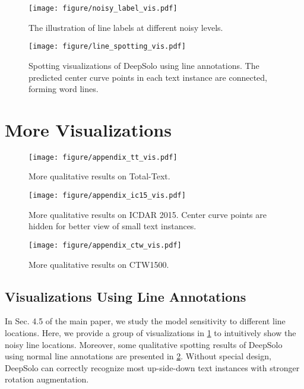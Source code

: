 \documentclass[10pt,twocolumn,letterpaper]{article}
\begin{document}
\begin{figure}[!t]
    \centering
    \texttt{[image: figure/noisy\_label\_vis.pdf]}
    \caption{The illustration of line labels at different noisy levels.}
    \label{fig:noisy_label_vis}
\end{figure}

\begin{figure}[!t]
    \centering
    \texttt{[image: figure/line\_spotting\_vis.pdf]}
    \caption{Spotting visualizations of DeepSolo using line annotations. The predicted center curve points in each text instance are connected, forming word lines.}
    \label{fig:line_spotting_vis}
\end{figure}

\section{More Visualizations}
\label{sec:vis}

\begin{figure*}[!t]
    \centering
    \texttt{[image: figure/appendix\_tt\_vis.pdf]}
    \caption{More qualitative results on Total-Text.}
    \label{fig:tt_vis}
\end{figure*}

\begin{figure*}[!t]
    \centering
    \texttt{[image: figure/appendix\_ic15\_vis.pdf]}
    \caption{More qualitative results on ICDAR 2015. Center curve points are hidden for better view of small text instances.}
    \label{fig:ic15_vis}
\end{figure*}

\begin{figure*}[!t]
    \centering
    \texttt{[image: figure/appendix\_ctw\_vis.pdf]}
    \caption{More qualitative results on CTW1500.}
    \label{fig:ctw_vis}
\end{figure*}

\subsection{Visualizations Using Line Annotations}
In Sec. 4.5 of the main paper, we study the model sensitivity to different line locations. Here, we provide a group of visualizations in \cref{fig:noisy_label_vis} to intuitively show the noisy line locations. Moreover, some qualitative spotting results of DeepSolo using normal line annotations are presented in \cref{fig:line_spotting_vis}. Without special design, DeepSolo can correctly recognize most up-side-down text instances with stronger rotation augmentation.
\end{document}
